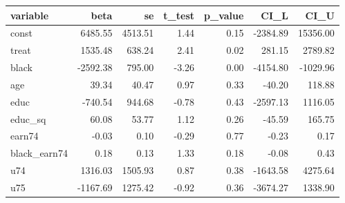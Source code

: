 \begin{tabular}{lrrrrrr}
  \hline
variable & beta & se & t\_test & p\_value & CI\_L & CI\_U \\ 
  \hline
const & 6485.55 & 4513.51 & 1.44 & 0.15 & -2384.89 & 15356.00 \\ 
  treat & 1535.48 & 638.24 & 2.41 & 0.02 & 281.15 & 2789.82 \\ 
  black & -2592.38 & 795.00 & -3.26 & 0.00 & -4154.80 & -1029.96 \\ 
  age & 39.34 & 40.47 & 0.97 & 0.33 & -40.20 & 118.88 \\ 
  educ & -740.54 & 944.68 & -0.78 & 0.43 & -2597.13 & 1116.05 \\ 
  educ\_sq & 60.08 & 53.77 & 1.12 & 0.26 & -45.59 & 165.75 \\ 
  earn74 & -0.03 & 0.10 & -0.29 & 0.77 & -0.23 & 0.17 \\ 
  black\_earn74 & 0.18 & 0.13 & 1.33 & 0.18 & -0.08 & 0.43 \\ 
  u74 & 1316.03 & 1505.93 & 0.87 & 0.38 & -1643.58 & 4275.64 \\ 
  u75 & -1167.69 & 1275.42 & -0.92 & 0.36 & -3674.27 & 1338.90 \\ 
   \hline
\end{tabular}
